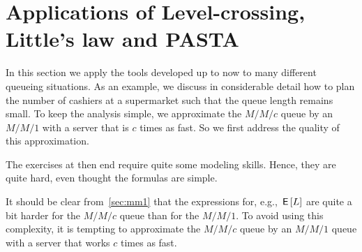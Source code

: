 


\section{Applications of Level-crossing, Little's law and PASTA}
\label{sec:mnmn1}

In this section we apply the tools developed up to now to many different queueing situations.
As an example, we discuss in considerable detail how to plan the number of cashiers at a supermarket such that the queue length remains small.
To keep the analysis simple, we approximate the $M/M/c$ queue by an $M/M/1$ with a server that is $c$ times as fast. So we first address the quality of this approximation. 

The exercises at then end require quite some  modeling skills.
Hence, they are quite hard, even thought the formulas are simple.


It should be clear from~\cref{sec:mm1} that the expressions for, e.g., $\,\mathsf{E}\left[L\right]$ are quite a bit harder for the $M/M/c$ queue than for the $M/M/1$.
To avoid using this complexity, it is tempting to approximate the $M/M/c$ queue by an $M/M/1$ queue with a server that works $c$ times as fast.
 
